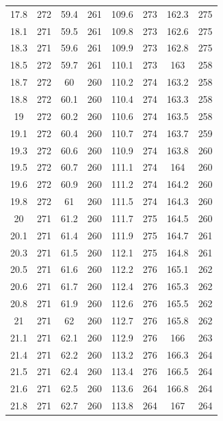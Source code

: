 \documentclass[12pt]{ctexart}
\numberwithin{equation}{section}
\begin{document}
\begin{longtable}{cc|cc|cc|cc}
17.8  &  272  &  59.4  &  261  &  109.6  &  273  &  162.3  &  275  \\
18.1  &  271  &  59.5  &  261  &  109.8  &  273  &  162.6  &  275  \\
18.3  &  271  &  59.6  &  261  &  109.9  &  273  &  162.8  &  275  \\
18.5  &  272  &  59.7  &  261  &  110.1  &  273  &  163  &  258  \\
18.7  &  272  &  60  &  260  &  110.2  &  274  &  163.2  &  258  \\
18.8  &  272  &  60.1  &  260  &  110.4  &  274  &  163.3  &  258  \\
19  &  272  &  60.2  &  260  &  110.6  &  274  &  163.5  &  258  \\
19.1  &  272  &  60.4  &  260  &  110.7  &  274  &  163.7  &  259  \\
19.3  &  272  &  60.6  &  260  &  110.9  &  274  &  163.8  &  260  \\
19.5  &  272  &  60.7  &  260  &  111.1  &  274  &  164  &  260  \\
19.6  &  272  &  60.9  &  260  &  111.2  &  274  &  164.2  &  260  \\
19.8  &  272  &  61  &  260  &  111.5  &  274  &  164.3  &  260  \\
20  &  271  &  61.2  &  260  &  111.7  &  275  &  164.5  &  260  \\
20.1  &  271  &  61.4  &  260  &  111.9  &  275  &  164.7  &  261  \\
20.3  &  271  &  61.5  &  260  &  112.1  &  275  &  164.8  &  261  \\
20.5  &  271  &  61.6  &  260  &  112.2  &  276  &  165.1  &  262  \\
20.6  &  271  &  61.7  &  260  &  112.4  &  276  &  165.3  &  262  \\
20.8  &  271  &  61.9  &  260  &  112.6  &  276  &  165.5  &  262  \\
21  &  271  &  62  &  260  &  112.7  &  276  &  165.8  &  262  \\
21.1  &  271  &  62.1  &  260  &  112.9  &  276  &  166  &  263  \\
21.4  &  271  &  62.2  &  260  &  113.2  &  276  &  166.3  &  264  \\
21.5  &  271  &  62.4  &  260  &  113.4  &  276  &  166.5  &  264  \\
21.6  &  271  &  62.5  &  260  &  113.6  &  264  &  166.8  &  264  \\
21.8  &  271  &  62.7  &  260  &  113.8  &  264  &  167  &  264  \\

\end{longtable}
\end{document}
